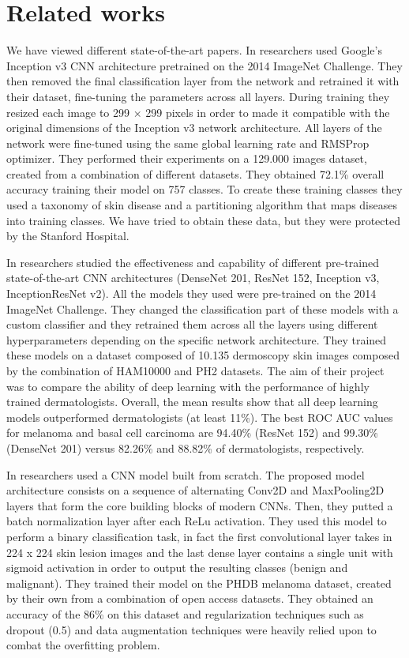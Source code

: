 \section{Related works} \label{related_works}
	We have viewed different state-of-the-art papers. 
	In \cite{article1} researchers used Google’s Inception v3 CNN architecture pretrained on the 2014 ImageNet Challenge. They then removed the final classification layer from the network and retrained it with their dataset, fine-tuning the parameters across all layers. During training they resized each image to 299 ×  299 pixels in order to made it compatible with the original dimensions of the Inception v3 network architecture. All layers of the network were fine-tuned using the same global learning rate and RMSProp optimizer. They performed their experiments on a 129.000 images dataset, created from a combination of different datasets. They obtained 72.1\% overall accuracy training their model on 757 classes. To create these training classes they used a taxonomy of skin disease and a partitioning algorithm that maps diseases into training classes. We have tried to obtain these data, but they were protected by the Stanford Hospital.
	
	\smallskip
	
	In \cite{article3} researchers studied the effectiveness and capability of different pre-trained state-of-the-art CNN architectures (DenseNet 201, ResNet 152, Inception v3, InceptionResNet v2). All the models they used were pre-trained on the 2014 ImageNet Challenge. They changed the classification part of these models with a custom classifier and they retrained them across all the layers using different hyperparameters depending on the specific network architecture. They trained these models on a dataset composed of 10.135 dermoscopy skin images composed by the combination of HAM10000 and PH2 datasets.  The aim of their project was to compare the ability of deep learning with the performance of highly trained dermatologists. Overall, the mean results show that all deep learning models outperformed dermatologists (at least 11\%). The best ROC AUC values for melanoma and basal cell carcinoma are 94.40\% (ResNet 152) and 99.30\% (DenseNet 201) versus 82.26\% and 88.82\% of dermatologists, respectively.
	
	\smallskip

	In \cite{article2} researchers used a CNN model built from scratch. The proposed model architecture consists on a sequence of alternating Conv2D and MaxPooling2D layers that form the core building blocks of modern CNNs. Then, they putted a batch normalization layer after each ReLu activation. They used this model to perform a binary classification task, in fact the first convolutional layer takes in 224 x 224 skin lesion images and the last dense layer contains a single unit with sigmoid activation in order to output the resulting classes (benign and malignant). They trained their model on the PHDB melanoma dataset, created by their own from a combination of open access datasets. They obtained an accuracy of the 86\% on this dataset and regularization techniques such as dropout (0.5) and data augmentation techniques were heavily relied upon to combat the overfitting problem.
	
